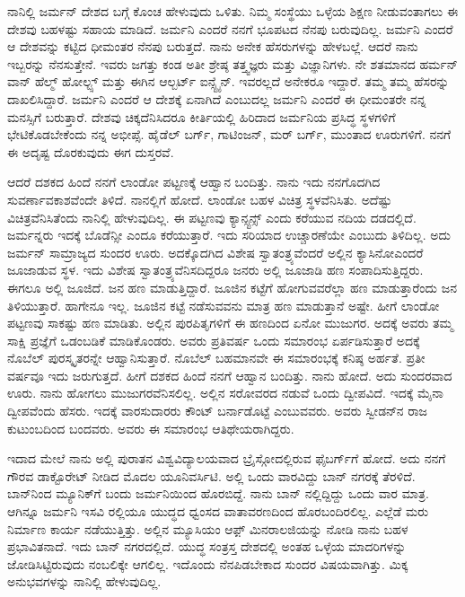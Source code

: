 
ನಾನಿಲ್ಲಿ ಜರ್ಮನ್ ದೇಶದ ಬಗ್ಗೆ ಕೊಂಚ ಹೇಳುವುದು ಒಳಿತು. ನಿಮ್ಮ ಸಂಸ್ಥೆಯು ಒಳ್ಳೆಯ ಶಿಕ್ಷಣ ನೀಡುವಂತಾಗಲು ಈ ದೇಶವು ಬಹಳಷ್ಟು ಸಹಾಯ ಮಾಡಿದೆ. ಜರ್ಮನಿ ಎಂದರೆ ನನಗೆ ಭೂಪಟದ ನೆನಪು ಬರುವುದಿಲ್ಲ. ಜರ್ಮನಿ ಎಂದರೆ ಆ ದೇಶವನ್ನು ಕಟ್ಟಿದ ಧೀಮಂತರ ನೆನಪು ಬರುತ್ತದೆ. ನಾನು ಅನೇಕ ಹೆಸರುಗಳನ್ನು ಹೇಳಬಲ್ಲೆ. ಆದರೆ ನಾನು ಇಬ್ಬರನ್ನು ನೆನಸುತ್ತೇನೆ. ಇವರು ಜಗತ್ತು ಕಂಡ ಅತೀ ಶ್ರೇಷ್ಠ ತತ್ತ್ವಜ್ಞರು ಮತ್ತು ವಿಜ್ಞಾನಿಗಳು.  ನೇ ಶತಮಾನದ ಹರ್ಮನ್ ವಾನ್ ಹೆಲ್ಮ್ ‍ಹೋಲ್ಟ್ಸ್ ಮತ್ತು ಈಗಿನ ಆಲ್ಬರ್ಟ್ ಐನ್ಸ್ಟೈನ್. ಇವರಲ್ಲದೆ ಅನೇಕರೂ ಇದ್ದಾರೆ. ತಮ್ಮ ತಮ್ಮ ಹೆಸರನ್ನು ದಾಖಲಿಸಿದ್ದಾರೆ. ಜರ್ಮನಿ ಎಂದರೆ ಆ ದೇಶಕ್ಕೆ ಏನಾಗಿದೆ ಎಂಬುದಲ್ಲ ಜರ್ಮನಿ ಎಂದರೆ ಈ ಧೀಮಂತರೇ ನನ್ನ ಮನಸ್ಸಿಗೆ ಬರುತ್ತಾರೆ. ದೇಶವು ಚಿಕ್ಕದೆನಿಸಿದರೂ ಕೀರ್ತಿಯಲ್ಲಿ ಹಿರಿದಾದ ಜರ್ಮನಿಯ ಪ್ರಸಿದ್ಧ ಸ್ಥಳಗಳಿಗೆ ಭೇಟಿಕೊಡಬೇಕೆಂದು ನನ್ನ ಅಭೀಪ್ಸೆ. ಹೈಡೆಲ್ ಬರ್ಗ್, ಗಾಟಿಂಜನ್, ಮರ್ ಬರ್ಗ್, ಮುಂತಾದ ಊರುಗಳಿಗೆ. ನನಗೆ ಈ ಅದೃಷ್ಟ ದೊರಕುವುದು ಈಗ ದುಸ್ತರವೆ.

ಆದರೆ ದಶಕದ ಹಿಂದೆ ನನಗೆ ಲಾಂಡೋ ಪಟ್ಟಣಕ್ಕೆ ಆಹ್ವಾನ ಬಂದಿತ್ತು. ನಾನು ಇದು ನನಗೊದಗಿದ ಸುವರ್ಣಾವಕಾಶವೆಂದೇ ತಿಳಿದೆ. ನಾನಲ್ಲಿಗೆ ಹೋದೆ. ಲಾಂಡೋ ಬಹಳ ವಿಚಿತ್ರ ಸ್ಥಳವೆನಿಸಿತು. ಅದೆಷ್ಟು ವಿಚಿತ್ರವೆನಿಸಿತೆಂದು ನಾನಿಲ್ಲಿ ಹೇಳುವುದಿಲ್ಲ. ಈ ಪಟ್ಟಣವು ಕ್ಯಾನ್ಸ್ಟನ್ಸ್ ಎಂದು ಕರೆಯುವ ನದಿಯ ದಡದಲ್ಲಿದೆ. ಜರ್ಮನ್ನರು ಇದಕ್ಕೆ ಬೊಡೆನ್ಸೀ ಎಂದೂ ಕರೆಯುತ್ತಾರೆ. ಇದು ಸರಿಯಾದ ಉಚ್ಚಾರಣೆಯೇ ಎಂಬುದು ತಿಳಿದಿಲ್ಲ. ಅದು ಜರ್ಮನ್ ಸಾಮ್ರಾಜ್ಯದ ಸುಂದರ ಊರು. ಅದಕ್ಕೊದಗಿದ ವಿಶೇಷ ಸ್ವಾತಂತ್ರ್ಯವೆಂದರೆ ಅಲ್ಲಿನ ಕ್ಯಾಸಿನೋ\enginline{--}ಎಂದರೆ ಜೂಜಾಡುವ ಸ್ಥಳ. ಇದು ವಿಶೇಷ ಸ್ವಾತಂತ್ರ್ಯವೆನಿಸದಿದ್ದರೂ ಜನರು ಅಲ್ಲಿ ಜೂಜಾಡಿ ಹಣ ಸಂಪಾದಿಸುತ್ತಿದ್ದರು. ಈಗಲೂ ಅಲ್ಲಿ ಜೂಜಿದೆ. ಜನ ಹಣ ಮಾಡುತ್ತಿದ್ದಾರೆ. ಜೂಜಿನ ಕಟ್ಟೆಗೆ ಹೋಗುವವರೆಲ್ಲಾ ಹಣ ಮಾಡುತ್ತಾರೆಂದು ಜನ ತಿಳಿಯುತ್ತಾರೆ. ಹಾಗೇನೂ ಇಲ್ಲ. ಜೂಜಿನ ಕಟ್ಟೆ ನಡೆಸುವವನು ಮಾತ್ರ ಹಣ ಮಾಡುತ್ತಾನೆ ಅಷ್ಟೇ. ಹೀಗೆ ಲಾಂಡೋ ಪಟ್ಟಣವು ಸಾಕಷ್ಟು ಹಣ ಮಾಡಿತು. ಅಲ್ಲಿನ ಪುರಪಿತೃಗಳಿಗೆ ಈ ಹಣದಿಂದ ಏನೋ ಮುಜುಗರ. ಅದಕ್ಕೆ ಅವರು ತಮ್ಮ ಸಾಕ್ಷಿ ಪ್ರಜ್ಞೆಗೆ ಒಡಂಬಡಿಕೆ ಮಾಡಿಕೊಂಡರು. ಅವರು ಪ್ರತಿವರ್ಷ ಒಂದು ಸಮಾರಂಭ ಏರ್ಪಡಿಸುತ್ತಾರೆ ಅದಕ್ಕೆ ನೊಬೆಲ್ ಪುರಸ್ಕೃತರನ್ನೇ ಆಹ್ವಾನಿಸುತ್ತಾರೆ. ನೊಬೆಲ್ ಬಹಮಾನವೇ ಈ ಸಮಾರಂಭಕ್ಕೆ ಕನಿಷ್ಠ ಅರ್ಹತೆ. ಪ್ರತೀ ವರ್ಷವೂ ಇದು ಜರುಗುತ್ತದೆ. ಹೀಗೆ ದಶಕದ ಹಿಂದೆ ನನಗೆ ಆಹ್ವಾನ ಬಂದಿತ್ತು. ನಾನು ಹೋದೆ. ಅದು ಸುಂದರವಾದ ಊರು. ನಾನು ಹೋಗಲು ಮುಜುಗರವೆನಿಸಲಿಲ್ಲ. ಅಲ್ಲಿನ ಸರೋವರದ ನಡುವೆ ಒಂದು ದ್ವೀಪವಿದೆ. ಇದಕ್ಕೆ ಮೈನಾ ದ್ವೀಪವೆಂದು ಹೆಸರು. ಇದಕ್ಕೆ ವಾರಸುದಾರರು ಕೌಂಟ್ ಬರ್ನಾಡೊಟ್ಟೆ ಎಂಬುವವರು. ಅವರು ಸ್ವೀಡನ್‍ನ ರಾಜ ಕುಟುಂಬದಿಂದ ಬಂದವರು. ಅವರು ಈ ಸಮಾರಂಭ ಆತಿಥೇಯರಾಗಿದ್ದರು.

\vskip 2pt

ಇದಾದ ಮೇಲೆ ನಾನು ಅಲ್ಲಿ ಪುರಾತನ ವಿಶ್ವವಿದ್ಯಾಲಯವಾದ ಬ್ರೈಸ್ಗೋದಲ್ಲಿರುವ ಫೈಬರ್ಗ್‌ಗೆ ಹೋದೆ. ಅದು ನನಗೆ ಗೌರವ ಡಾಕ್ಟೊರೇಟ್ ನೀಡಿದ ಮೊದಲ ಯೂನಿವರ್ಸಿಟಿ. ಅಲ್ಲಿ ಒಂದು ವಾರವಿದ್ದು ಬಾನ್ ನಗರಕ್ಕೆ ತೆರಳಿದೆ. ಬಾನ್‍ನಿಂದ ಮ್ಯೂನಿಕ್‍ಗೆ ಬಂದು ಜರ್ಮನಿಯಿಂದ ಹೊರಬಿದ್ದೆ. ನಾನು ಬಾನ್ ನಲ್ಲಿದ್ದಿದ್ದು ಒಂದು ವಾರ ಮಾತ್ರ. ಆಗಿನ್ನೂ ಜರ್ಮನಿ ಇಸವಿ ರಲ್ಲಿಯೂ ಯುದ್ಧದ ಧ್ವಂಸದ ವಾತಾವರಣದಿಂದ ಹೊರಬಂದಿರಲಿಲ್ಲ. ಎಲ್ಲೆಡೆ ಮರು ನಿರ್ಮಾಣ ಕಾರ್ಯ ನಡೆಯುತ್ತಿತ್ತು. ಅಲ್ಲಿನ ಮ್ಯೂಸಿಯಂ ಆಫ಼್ ಮಿನರಾಲಜಿಯನ್ನು ನೋಡಿ ನಾನು ಬಹಳ ಪ್ರಭಾವಿತನಾದೆ. ಇದು ಬಾನ್ ನಗರದಲ್ಲಿದೆ. ಯುದ್ಧ ಸಂತ್ರಸ್ತ ದೇಶದಲ್ಲಿ ಅಂತಹ ಒಳ್ಳೆಯ ಮಾದರಿಗಳನ್ನು ಜೋಡಿಸಿಟ್ಟಿರುವುದು ನಂಬಲಿಕ್ಕೇ ಆಗಲಿಲ್ಲ. ಇದೊಂದು ನೆನಪಿಡಬೇಕಾದ ಸುಂದರ ವಿಷಯವಾಗಿತ್ತು. ಮಿಕ್ಕ ಅನುಭವಗಳನ್ನು ನಾನಿಲ್ಲಿ ಹೇಳುವುದಿಲ್ಲ.

